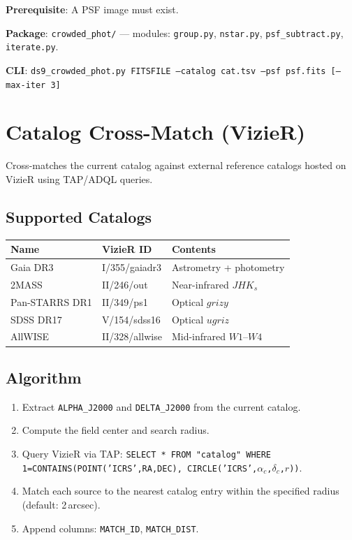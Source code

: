 \documentclass[11pt,fleqn]{book}
\begin{document}
\textbf{Prerequisite}: A PSF image must exist.

\textbf{Package}: \texttt{crowded\_phot/} --- modules: \texttt{group.py}, \texttt{nstar.py}, \texttt{psf\_subtract.py}, \texttt{iterate.py}.

\textbf{CLI}: \texttt{ds9\_crowded\_phot.py FITSFILE --catalog cat.tsv --psf psf.fits [--max-iter 3]}


\section{Catalog Cross-Match (VizieR)}

Cross-matches the current catalog against external reference catalogs hosted on VizieR using TAP/ADQL queries.

\subsection{Supported Catalogs}

\begin{center}
\begin{tabular}{lll}
\toprule
\textbf{Name} & \textbf{VizieR ID} & \textbf{Contents} \\
\midrule
Gaia DR3 & I/355/gaiadr3 & Astrometry + photometry \\
2MASS & II/246/out & Near-infrared $JHK_s$ \\
Pan-STARRS DR1 & II/349/ps1 & Optical $grizy$ \\
SDSS DR17 & V/154/sdss16 & Optical $ugriz$ \\
AllWISE & II/328/allwise & Mid-infrared $W1$--$W4$ \\
\bottomrule
\end{tabular}
\end{center}

\subsection{Algorithm}

\begin{enumerate}[leftmargin=2em]
  \item Extract \texttt{ALPHA\_J2000} and \texttt{DELTA\_J2000} from the current catalog.
  \item Compute the field center and search radius.
  \item Query VizieR via TAP: \texttt{SELECT * FROM "catalog" WHERE 1=CONTAINS(POINT('ICRS',RA,DEC), CIRCLE('ICRS',$\alpha_c$,$\delta_c$,$r$))}.
  \item Match each source to the nearest catalog entry within the specified radius (default: 2\,arcsec).
  \item Append columns: \texttt{MATCH\_ID}, \texttt{MATCH\_DIST}.
\end{enumerate}
\end{document}
